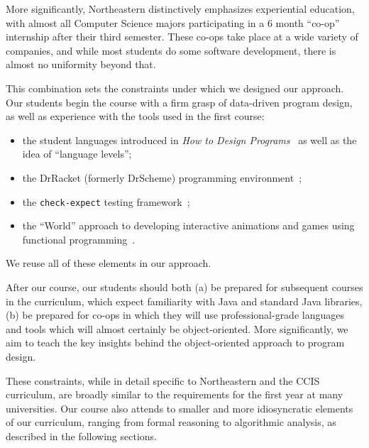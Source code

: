 \documentclass[submission,copyright]{eptcs}
\begin{document}
More significantly, Northeastern distinctively emphasizes experiential
education, with almost all Computer Science majors participating in a
6 month ``co-op'' internship after their third semester.  These co-ops
take place at a wide variety of companies, and while most students do
some software development, there is almost no uniformity beyond that. 

This combination sets the constraints under which we designed our
approach.  Our students begin the course with a firm grasp of
data-driven program design, as well as experience with the tools used
in the first course:

\begin{itemize}
  \item the student languages introduced in \emph{How to Design
    Programs}~\cite{dvanhorn:Felleisen2004Structure,
    dvanhorn:Felleisen2001How} as well as the idea of ``language levels'';

  \item the DrRacket (formerly DrScheme) 
    programming environment~\cite{dvanhorn:Findler2002DrScheme};

  \item the \texttt{check-expect} testing framework~\cite{local:check-expect};

  \item the ``World'' approach to developing interactive animations
    and games using functional
    programming~\cite{dvanhorn:Felleisen2009Functional}.
\end{itemize}

\noindent
We reuse all of these elements in our approach.

After our course, our students should both (a) be prepared for
subsequent courses in the curriculum, which expect familiarity with
Java and standard Java libraries, (b) be prepared for co-ops in which
they will use professional-grade languages and tools which will
almost certainly be object-oriented.  More significantly, we aim to
teach the key insights behind the object-oriented approach to program
design.

These constraints, while in detail specific to Northeastern and the
CCIS curriculum, are broadly similar to the requirements for the first
year at many universities.  Our course also attends to smaller and
more idiosyncratic elements of our curriculum, ranging from formal
reasoning to algorithmic analysis, as described in the following
sections.
\end{document}
